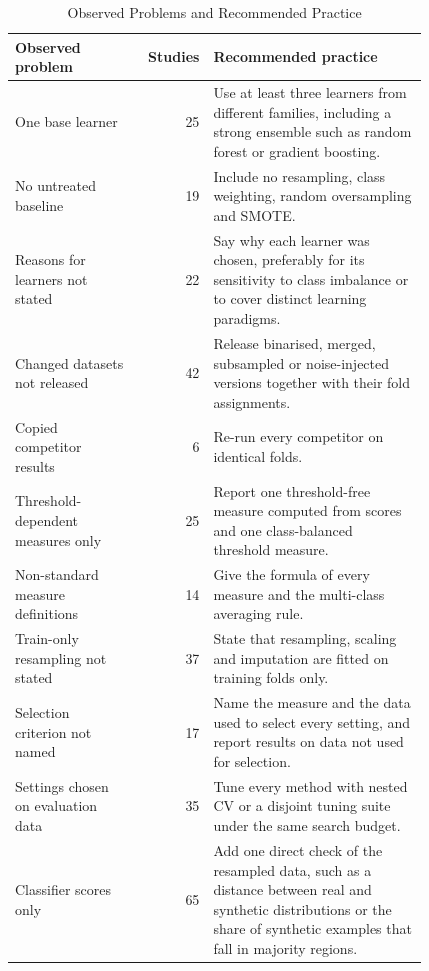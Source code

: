 \begin{table}[t]
  \caption{Observed Problems and Recommended Practice}
  \label{tab:empirical-remedies}
  \footnotesize
  \setlength{\tabcolsep}{4pt}
  \begin{tabular}{@{}p{0.3\linewidth}rp{0.52\linewidth}@{}}
    \toprule
    Observed problem & Studies & Recommended practice\\
    \midrule
    One base learner & 25 & Use at least three learners from different families, including a strong ensemble such as random forest or gradient boosting.\\
    No untreated baseline & 19 & Include no resampling, class weighting, random oversampling and SMOTE.\\
    Reasons for learners not stated & 22 & Say why each learner was chosen, preferably for its sensitivity to class imbalance or to cover distinct learning paradigms.\\
    Changed datasets not released & 42 & Release binarised, merged, subsampled or noise-injected versions together with their fold assignments.\\
    Copied competitor results & 6 & Re-run every competitor on identical folds.\\
    Threshold-dependent measures only & 25 & Report one threshold-free measure computed from scores and one class-balanced threshold measure.\\
    Non-standard measure definitions & 14 & Give the formula of every measure and the multi-class averaging rule.\\
    Train-only resampling not stated & 37 & State that resampling, scaling and imputation are fitted on training folds only.\\
    Selection criterion not named & 17 & Name the measure and the data used to select every setting, and report results on data not used for selection.\\
    Settings chosen on evaluation data & 35 & Tune every method with nested CV or a disjoint tuning suite under the same search budget.\\
    Classifier scores only & 65 & Add one direct check of the resampled data, such as a distance between real and synthetic distributions or the share of synthetic examples that fall in majority regions.\\

\end{tabular}
\end{table}

